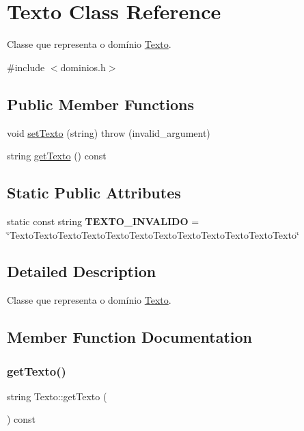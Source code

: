 \hypertarget{classTexto}{}\section{Texto Class Reference}
\label{classTexto}


Classe que representa o domínio \hyperlink{classTexto}{Texto}.  




{\ttfamily \#include $<$dominios.\+h$>$}

\subsection*{Public Member Functions}
\begin{DoxyCompactItemize}
\item 
void \hyperlink{classTexto_a2757e0409bd76bb77c8eb6ecb09cc69d}{set\+Texto} (string)  throw (invalid\+\_\+argument)
\item 
string \hyperlink{classTexto_a69463b543f36eaf86076ef48c896987f}{get\+Texto} () const
\end{DoxyCompactItemize}
\subsection*{Static Public Attributes}
\begin{DoxyCompactItemize}
\item 
\mbox{\label{classTexto_a4ee6b58c141fba69acb77d90d6cc377d}} 
static const string {\bfseries T\+E\+X\+T\+O\+\_\+\+I\+N\+V\+A\+L\+I\+DO} = \char`\"{}Texto\+Texto\+Texto\+Texto\+Texto\+Texto\+Texto\+Texto\+Texto\+Texto\+Texto\+Texto\char`\"{}
\end{DoxyCompactItemize}


\subsection{Detailed Description}
Classe que representa o domínio \hyperlink{classTexto}{Texto}. 

\subsection{Member Function Documentation}
\mbox{\label{classTexto_a69463b543f36eaf86076ef48c896987f}} 
\subsubsection{\texorpdfstring{get\+Texto()}{getTexto()}}
{\footnotesize\ttfamily string Texto\+::get\+Texto (\begin{DoxyParamCaption}{ }\end{DoxyParamCaption}) const\hspace{0.3cm}{\ttfamily [inline]}}

